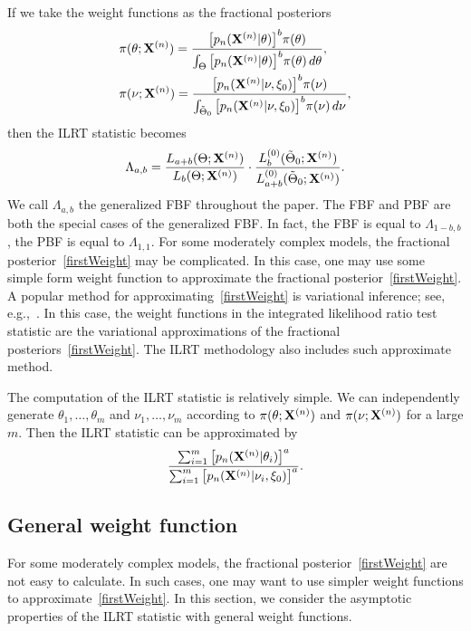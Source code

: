 \documentclass[11pt]{article}
\theoremstyle{plain}
\theoremstyle{definition}
\theoremstyle{remark}
\begin{document}
If we take the weight functions as the fractional posteriors
\begin{equation}\label{firstWeight}
    \begin{split}
&\pi(\theta;\mathbf{X}^{(n)})=\frac{\big[p_n(\mathbf{X}^{(n)}|\theta)\big]^b \pi(\theta)}{\int_{\Theta}\big[p_n(\mathbf{X}^{(n)}|\theta)\big]^b \pi(\theta)\, d\theta},
\\
&\pi(\nu;\mathbf{X}^{(n)})=\frac{\big[p_n(\mathbf{X}^{(n)}|\nu,
    \xi_0)\big]^b \pi(\nu)}{\int_{\tilde{\Theta}_0}\big[p_n(\mathbf{X}^{(n)}|\nu,\xi_0)\big]^b \pi(\nu)\, d\nu},
    \end{split}
\end{equation}
then the ILRT statistic becomes
$$
    \Lambda_{a,b}=
    \frac{L_{a+b}(\Theta;\mathbf{X}^{(n)})}{L_{b}(\Theta;\mathbf{X}^{(n)})}\cdot \frac{L_{b}^{(0)}(\tilde{\Theta}_0;\mathbf{X}^{(n)})}{L_{a+b}^{(0)}(\tilde{\Theta}_0;\mathbf{X}^{(n)})}.
$$
We call $\Lambda_{a,b}$ the generalized FBF throughout the paper.
The FBF and PBF are both the special cases of the generalized FBF.
In fact, the FBF is equal to $\Lambda_{1-b,b}$, the PBF is equal to $\Lambda_{1,1}$.
For some moderately complex models, the fractional posterior~\eqref{firstWeight} may be complicated.
In this case, one may use some simple form weight function to approximate the fractional posterior~\eqref{firstWeight}.
A popular method for approximating~\eqref{firstWeight} is variational inference;
see, e.g.,~\cite{blei2017}.
In this case, the weight functions in the integrated likelihood ratio test statistic are the variational approximations of the fractional posteriors~\eqref{firstWeight}.
The ILRT methodology also includes such approximate method.

The computation of the ILRT statistic is relatively simple.
We can independently generate $\theta_1,\ldots,\theta_m$ and $\nu_1,\ldots,\nu_m$ according to $\pi(\theta;\mathbf{X}^{(n)})$ and $\pi(\nu;\mathbf{X}^{(n)})$ for a large $m$.
Then the ILRT statistic can be approximated by
\begin{equation*}
    \frac{\sum_{i=1}^m \big[p_n(\mathbf{X}^{(n)}|\theta_i)\big]^{a}}{\sum_{i=1}^m\big[p_n(\mathbf{X}^{(n)}|\nu_i,\xi_0)\big]^{a}}.
\end{equation*}





\subsection{General weight function}
For some moderately complex models, the fractional posterior~\eqref{firstWeight} are not easy to calculate.
In such cases, one may want to use simpler weight functions to approximate~\eqref{firstWeight}.
In this section, we consider the asymptotic properties of the ILRT statistic with general weight functions.
\end{document}

